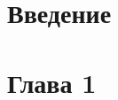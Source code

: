 \documentclass[a4paper,12pt]{article}
\begin{document}

\tableofcontents
\newpage

\section*{Введение}
\newpage
\section*{Глава 1}
\end{document}
